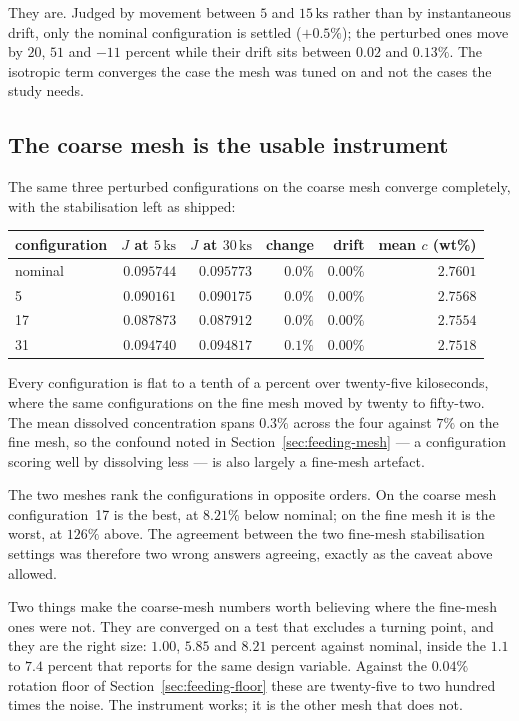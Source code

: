 \documentclass[11pt,a4paper]{article}
\theoremstyle{plain}
\theoremstyle{definition}
\theoremstyle{remark}
\begin{document}
They are. Judged by movement between $5$ and $15\,\mathrm{ks}$ rather than by
instantaneous drift, only the nominal configuration is settled
($+0.5\%$); the perturbed ones move by $20$, $51$ and $-11$ percent while their
drift sits between $0.02$ and $0.13\%$. The isotropic term converges the case
the mesh was tuned on and not the cases the study needs.

\subsection{The coarse mesh is the usable instrument}
\label{sec:feeding-coarse}

The same three perturbed configurations on the coarse mesh converge completely,
with the stabilisation left as shipped:

\begin{center}
\small
\begin{tabular}{@{}lrrrrr@{}}
\toprule
configuration & $J$ at $5\,\mathrm{ks}$ & $J$ at $30\,\mathrm{ks}$ &
  change & drift & mean $c$ (wt\%) \\
\midrule
nominal & $0.095744$ & $0.095773$ & $0.0\%$ & $0.00\%$ & $2.7601$ \\
5       & $0.090161$ & $0.090175$ & $0.0\%$ & $0.00\%$ & $2.7568$ \\
17      & $0.087873$ & $0.087912$ & $0.0\%$ & $0.00\%$ & $2.7554$ \\
31      & $0.094740$ & $0.094817$ & $0.1\%$ & $0.00\%$ & $2.7518$ \\
\bottomrule
\end{tabular}
\end{center}

Every configuration is flat to a tenth of a percent over twenty-five
kiloseconds, where the same configurations on the fine mesh moved by twenty to
fifty-two. The mean dissolved concentration spans $0.3\%$ across the four
against $7\%$ on the fine mesh, so the confound noted in
Section~\ref{sec:feeding-mesh} --- a configuration scoring well by dissolving
less --- is also largely a fine-mesh artefact.

The two meshes rank the configurations in opposite orders. On the coarse mesh
configuration~17 is the best, at $8.21\%$ below nominal; on the fine mesh it is
the worst, at $126\%$ above. The agreement between the two fine-mesh
stabilisation settings was therefore two wrong answers agreeing, exactly as the
caveat above allowed.

Two things make the coarse-mesh numbers worth believing where the fine-mesh ones
were not. They are converged on a test that excludes a turning point, and they
are the right size: $1.00$, $5.85$ and $8.21$ percent against nominal, inside the
$1.1$ to $7.4$ percent that \cite{hofer} reports for the same design variable.
Against the $0.04\%$ rotation floor of Section~\ref{sec:feeding-floor} these are
twenty-five to two hundred times the noise. The instrument works; it is the
other mesh that does not.
\end{document}
